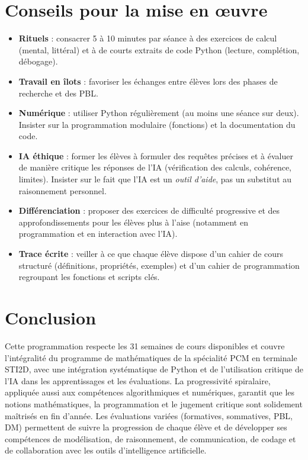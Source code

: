 \documentclass[a4paper,12pt]{article}
\begin{document}
	\section{Conseils pour la mise en œuvre}
	\begin{itemize}
		\item \textbf{Rituels} : consacrer 5 à 10 minutes par séance à des exercices de calcul (mental, littéral) et à de courts extraits de code Python (lecture, complétion, débogage).
		\item \textbf{Travail en îlots} : favoriser les échanges entre élèves lors des phases de recherche et des PBL.
		\item \textbf{Numérique} : utiliser Python régulièrement (au moins une séance sur deux). Insister sur la programmation modulaire (fonctions) et la documentation du code.
		\item \textbf{IA éthique} : former les élèves à formuler des requêtes précises et à évaluer de manière critique les réponses de l’IA (vérification des calculs, cohérence, limites). Insister sur le fait que l’IA est un \emph{outil d’aide}, pas un substitut au raisonnement personnel.
		\item \textbf{Différenciation} : proposer des exercices de difficulté progressive et des approfondissements pour les élèves plus à l’aise (notamment en programmation et en interaction avec l’IA).
		\item \textbf{Trace écrite} : veiller à ce que chaque élève dispose d’un cahier de cours structuré (définitions, propriétés, exemples) et d’un cahier de programmation regroupant les fonctions et scripts clés.
	\end{itemize}
	
	\section*{Conclusion}
	Cette programmation respecte les 31 semaines de cours disponibles et couvre l’intégralité du programme de mathématiques de la spécialité PCM en terminale STI2D, avec une intégration systématique de Python et de l’utilisation critique de l’IA dans les apprentissages et les évaluations. La progressivité spiralaire, appliquée aussi aux compétences algorithmiques et numériques, garantit que les notions mathématiques, la programmation et le jugement critique sont solidement maîtrisés en fin d’année. Les évaluations variées (formatives, sommatives, PBL, DM) permettent de suivre la progression de chaque élève et de développer ses compétences de modélisation, de raisonnement, de communication, de codage et de collaboration avec les outils d’intelligence artificielle.
	
\end{document}
